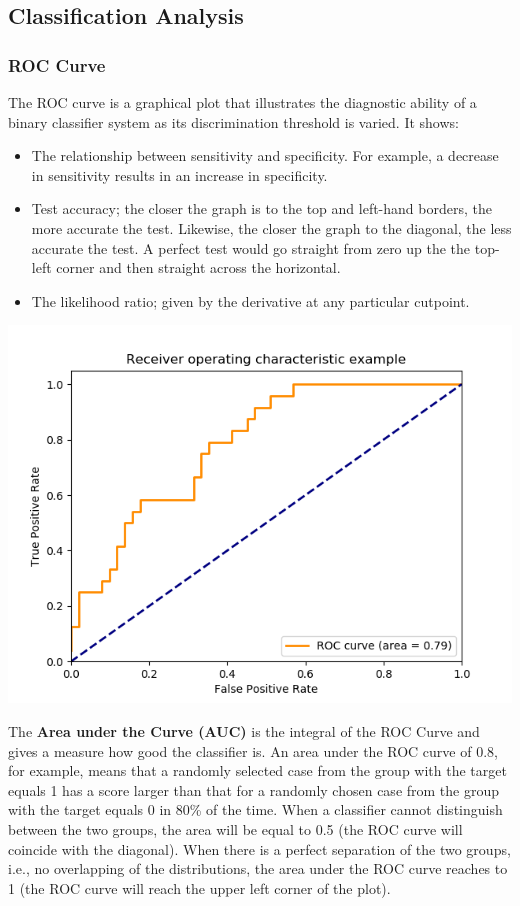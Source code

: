 \documentclass[english]{latex4ei/latex4ei_sheet}
\begin{document}
\begin{sectionbox}
\subsection{Classification Analysis}

\subsubsection{ROC Curve}
The ROC curve is a graphical plot that illustrates the diagnostic ability of a binary classifier system as its discrimination threshold is varied. It shows:
\begin{itemize}
    \item The relationship between sensitivity and specificity. For example, a decrease in sensitivity results in an increase in specificity.
    \item Test accuracy; the closer the graph is to the top and left-hand borders, the more accurate the test. Likewise, the closer the graph to the diagonal, the less accurate the test. A perfect test would go straight from zero up the the top-left corner and then straight across the horizontal.
    \item The likelihood ratio; given by the derivative at any particular cutpoint.
\end{itemize}
\begin{center}
	    \includegraphics[width = 0.9\columnwidth]{figures/sphx_glr_plot_roc_001.png}
	\end{center}
The \textbf{Area under the Curve (AUC)} is the integral of the ROC Curve and gives a measure how good the classifier is. An area under the ROC curve of 0.8, for example, means that a randomly selected case from the group with the target equals 1 has a score larger than that for a randomly chosen case from the group with the target equals 0 in 80\% of the time. When a classifier cannot distinguish between the two groups, the area will be equal to 0.5 (the ROC curve will coincide with the diagonal). When there is a perfect separation of the two groups, i.e., no overlapping of the distributions, the area under the ROC curve reaches to 1 (the ROC curve will reach the upper left corner of the plot). 
\end{sectionbox}
\end{document}
